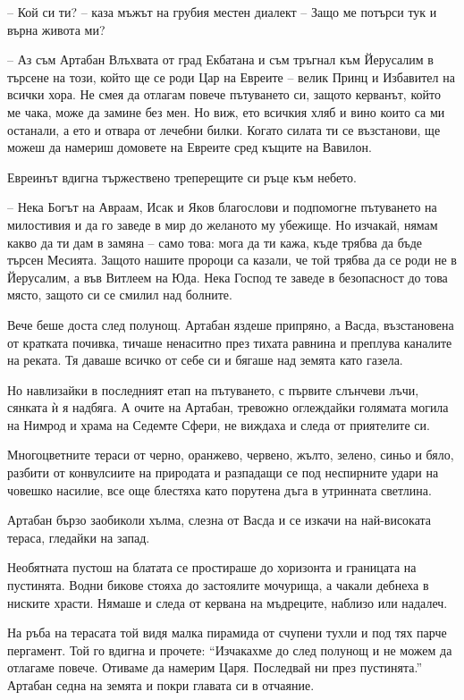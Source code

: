-- Кой си ти? -- каза мъжът на грубия местен диалект -- Защо ме потърси тук и
върна живота ми?

-- Аз съм Артабан Влъхвата от град Екбатана и съм тръгнал към Йерусалим в
търсене на този, който ще се роди Цар на Евреите -- велик Принц и Избавител на
всички хора. Не смея да отлагам повече пътуването си, защото керванът, който ме
чака, може да замине без мен. Но виж, ето всичкия хляб и вино които са ми
останали, а ето и отвара от лечебни билки. Когато силата ти се възстанови, ще
можеш да намериш домовете на Евреите сред къщите на Вавилон.

Евреинът вдигна тържествено треперещите си ръце към небето.

-- Нека Богът на Авраам, Исак и Яков благослови и подпомогне пътуването на
милостивия и да го заведе в мир до желаното му убежище. Но изчакай, нямам какво
да ти дам в замяна -- само това: мога да ти кажа, къде трябва да бъде търсен
Месията. Защото нашите пророци са казали, че той трябва да се роди не в
Йерусалим, а във Витлеем на Юда. Нека Господ те заведе в безопасност до това
място, защото си се смилил над болните.

Вече беше доста след полунощ. Артабан яздеше припряно, а Васда, възстановена от
кратката почивка, тичаше ненаситно през тихата равнина и преплува каналите на
реката. Тя даваше всичко от себе си и бягаше над земята като газела.

Но навлизайки в последният етап на пътуването, с първите слънчеви лъчи, сянката
ѝ я надбяга. А очите на Артабан, тревожно оглеждайки голямата могила на Нимрод и
храма на Седемте Сфери, не виждаха и следа от приятелите си.

Многоцветните тераси от черно, оранжево, червено, жълто, зелено, синьо и бяло,
разбити от конвулсиите на природата и разпадащи се под неспирните удари на
човешко насилие, все още блестяха като порутена дъга в утринната светлина.

Артабан бързо заобиколи хълма, слезна от Васда и се изкачи на най-високата
тераса, гледайки на запад.

Необятната пустош на блатата се простираше до хоризонта и границата на
пустинята. Водни бикове стояха до застоялите мочурища, а чакали дебнеха в
ниските храсти. Нямаше и следа от кервана на мъдреците, наблизо или надалеч.

На ръба на терасата той видя малка пирамида от счупени тухли и под тях парче
пергамент. Той го вдигна и прочете: ``Изчакахме до след полунощ и не можем да
отлагаме повече. Отиваме да намерим Царя. Последвай ни през пустинята.'' Артабан
седна на земята и покри главата си в отчаяние.

